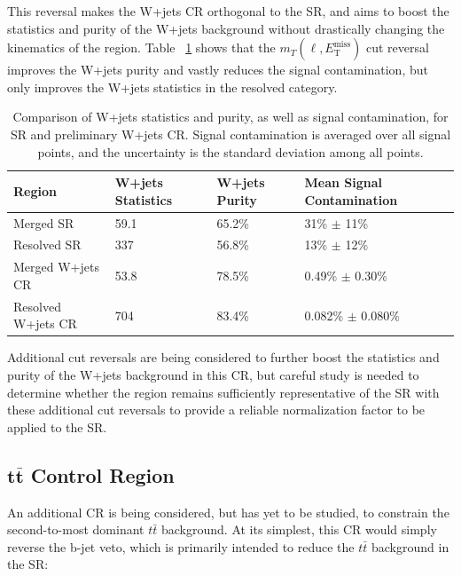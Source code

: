 \documentclass[12pt]{article}
\newcommand*{\met}{\ensuremath{E_\text{T}^\text{miss}}}
\begin{document}
This reversal makes the W+jets CR orthogonal to the SR, and aims to boost the statistics and purity of the W+jets background without drastically changing the kinematics of the region. Table ~\ref{tab:crw_info} shows that the $m_T(\ell, \met)$ cut reversal improves the W+jets purity and vastly reduces the signal contamination, but only improves the W+jets statistics in the resolved category.

\begin{table}[H]
\centering
\caption{Comparison of W+jets statistics and purity, as well as signal contamination, for SR and preliminary W+jets CR. Signal contamination is averaged over all signal points, and the uncertainty is the standard deviation among all points.}
\label{tab:crw_info}
\begin{footnotesize}
\renewcommand{\arraystretch}{1.5}
\begin{tabular}{|p{30mm}|p{25mm}|p{25mm}|p{45mm}|}
\hline
\textbf{Region} & \textbf{W+jets Statistics} & \textbf{W+jets Purity} & \textbf{Mean Signal Contamination}   \\ \hline
Merged SR    & 59.1 & 65.2\% & 31\% $\pm$ 11\%        \\ \hline
Resolved SR    & 337 & 56.8\% & 13\% $\pm$ 12\%        \\ \hline
Merged W+jets CR    & 53.8 & 78.5\% & 0.49\% $\pm$ 0.30\%        \\ \hline
Resolved W+jets CR    & 704 & 83.4\% & 0.082\% $\pm$ 0.080\%        \\ \hline
\end{tabular}
\end{footnotesize}
\end{table}

Additional cut reversals are being considered to further boost the statistics and purity of the W+jets background in this CR, but careful study is needed to determine whether the region remains sufficiently representative of the SR with these additional cut reversals to provide a reliable normalization factor to be applied to the SR. 

\subsection{$\bm{t\bar{t}}$ Control Region}

An additional CR is being considered, but has yet to be studied, to constrain the second-to-most dominant $t\bar{t}$ background. At its simplest, this CR would simply reverse the b-jet veto, which is primarily intended to reduce the $t\bar{t}$ background in the SR: 
\end{document}
